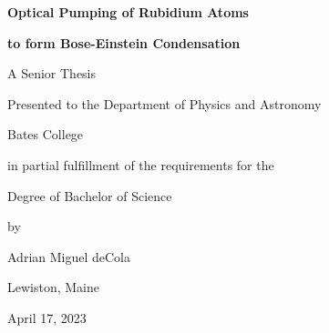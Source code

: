

\vspace*{4cm} 

\centerline{\LARGE \textbf{Optical Pumping of Rubidium Atoms}}
\medskip
\centerline{\LARGE \textbf{  to form Bose-Einstein Condensation }} 
\medskip
\begin{figure}[h!]
\begin{center}
\end{center}
\end{figure}
\centerline{ A Senior Thesis}
\medskip
\centerline{ Presented to the Department of Physics and Astronomy}
\medskip
\centerline{Bates College}
\medskip
\centerline{in partial fulfillment of the requirements for the}
\medskip
\centerline{\Large Degree of Bachelor of Science}
\medskip
\centerline{by}
\medskip
\centerline{\Large Adrian Miguel deCola}
\medskip
\centerline{Lewiston, Maine}
\medskip
\centerline{April 17, 2023}

\newpage

